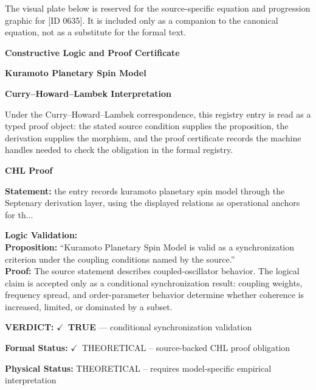 \begingroup\footnotesize\sloppy
The visual plate below is reserved for the source-specific equation and progression graphic for [ID 0635]. It is included only as a companion to the canonical equation, not as a substitute for the formal text.
\par\endgroup
\ifTZPDarkEdition
{}
\fi

\clearpage
\begingroup\tzpsupportsetup
\noindent\textbf{\fontsize{10.8pt}{12.8pt}\selectfont [ID 0635] Constructive Logic and Proof Certificate}\par
\noindent\textbf{\fontsize{10pt}{12pt}\selectfont Kuramoto Planetary Spin Model}\par
\vspace{0.45em}
\begingroup
\footnotesize
\setlength{\parskip}{0.22em}
\setlength{\parindent}{0pt}
\noindent\textbf{Curry--Howard--Lambek Interpretation}\par
Under the Curry--Howard--Lambek correspondence, this registry entry is read as a typed proof
object: the stated source condition supplies the proposition, the derivation supplies the
morphism, and the proof certificate records the machine handles needed to check the obligation
in the formal registry.

\vspace{0.45em}
\noindent\textbf{CHL Proof}\par
\textbf{Statement:} the entry records kuramoto planetary spin model through the Septenary derivation layer,
using the displayed relations as operational anchors for th...

\textbf{Logic Validation:}\\
\textbf{Proposition:} ``Kuramoto Planetary Spin Model is valid as a synchronization criterion under the coupling
conditions named by the source.''\\
\textbf{Proof:} The source statement describes coupled-oscillator behavior. The logical claim is
accepted only as a conditional synchronization result: coupling weights, frequency
spread, and order-parameter behavior determine whether coherence is increased, limited,
or dominated by a subset.

\textbf{VERDICT:} \ensuremath{\checkmark}\ \textbf{TRUE} --- conditional synchronization validation

\textbf{Formal Status:} \ensuremath{\checkmark}\ THEORETICAL -- source-backed CHL proof obligation

\textbf{Physical Status:} THEORETICAL -- requires model-specific empirical interpretation
\par\vspace{0.45em}
\par
\ifTZPDarkEdition
{}
\fi
\endgroup
\endgroup

